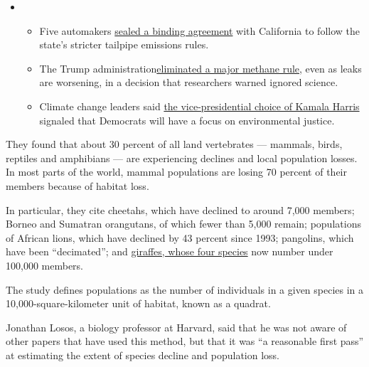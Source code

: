 \begin{itemize}
\item
  \begin{itemize}
  \tightlist
  \item
    Five automakers
    \href{https://www.nytimes3xbfgragh.onion/2020/08/17/climate/california-automakers-pollution.html?action=click\&pgtype=Article\&state=default\&region=MAIN_CONTENT_1\&context=storylines_keepup}{sealed
    a binding agreement} with California to follow the state's stricter
    tailpipe emissions rules.
  \item
    The Trump
    administration\href{https://www.nytimes3xbfgragh.onion/2020/08/13/climate/trump-methane.html?action=click\&pgtype=Article\&state=default\&region=MAIN_CONTENT_1\&context=storylines_keepup}{eliminated
    a major methane rule}, even as leaks are worsening, in a decision
    that researchers warned ignored science.
  \item
    Climate change leaders said
    \href{https://www.nytimes3xbfgragh.onion/2020/08/12/climate/kamala-harris-environmental-justice.html?action=click\&pgtype=Article\&state=default\&region=MAIN_CONTENT_1\&context=storylines_keepup}{the
    vice-presidential choice of Kamala Harris} signaled that Democrats
    will have a focus on environmental justice.
  \end{itemize}
\end{itemize}

They found that about 30 percent of all land vertebrates --- mammals,
birds, reptiles and amphibians --- are experiencing declines and local
population losses. In most parts of the world, mammal populations are
losing 70 percent of their members because of habitat loss.

In particular, they cite cheetahs, which have declined to around 7,000
members; Borneo and Sumatran orangutans, of which fewer than 5,000
remain; populations of African lions, which have declined by 43 percent
since 1993; pangolins, which have been ``decimated''; and
\href{https://www.nytimes3xbfgragh.onion/2016/09/09/science/a-quadruple-take-on-the-giraffe-its-four-species-not-one.html}{giraffes,
whose four species} now number under 100,000 members.

The study defines populations as the number of individuals in a given
species in a 10,000-square-kilometer unit of habitat, known as a
quadrat.

Jonathan Losos, a biology professor at Harvard, said that he was not
aware of other papers that have used this method, but that it was ``a
reasonable first pass'' at estimating the extent of species decline and
population loss.

